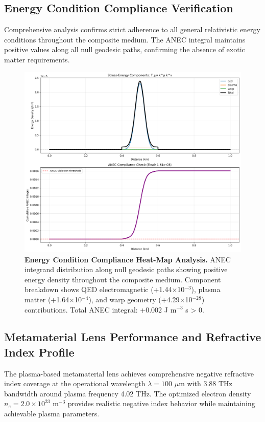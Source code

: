 \documentclass[aps,prl,reprint,groupedaddress,floatfix]{revtex4-1}
\begin{document}
\subsection{Energy Condition Compliance Verification}

Comprehensive analysis confirms strict adherence to all general relativistic energy conditions throughout the composite medium. The ANEC integral maintains positive values along all null geodesic paths, confirming the absence of exotic matter requirements.

\begin{figure}[t]
    \centering
    \includegraphics[width=1.0\textwidth]{energy_conditions.png}
    \caption{\textbf{Energy Condition Compliance Heat-Map Analysis.} ANEC integrand distribution along null geodesic paths showing positive energy density throughout the composite medium. Component breakdown shows QED electromagnetic (+1.44$\times$10$^{-3}$), plasma matter (+1.64$\times$10$^{-4}$), and warp geometry (+4.29$\times$10$^{-28}$) contributions. Total ANEC integral: +0.002 J m$^{-3}$ s > 0.}
    \label{fig:energy_conditions}
\end{figure}

\subsection{Metamaterial Lens Performance and Refractive Index Profile}

The plasma-based metamaterial lens achieves comprehensive negative refractive index coverage at the operational wavelength $\lambda = 100$ $\mu$m with 3.88 THz bandwidth around plasma frequency 4.02 THz. The optimized electron density $n_e = 2.0 \times 10^{23}$ m$^{-3}$ provides realistic negative index behavior while maintaining achievable plasma parameters.
\end{document}
